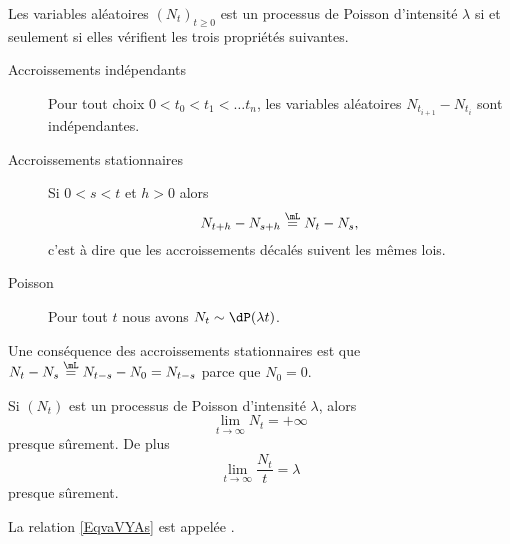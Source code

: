 \begin{theorem}
    Les variables aléatoires \( (N_t)_{t\geq 0}\) est un processus de Poisson d'intensité \( \lambda\) si et seulement si elles vérifient les trois propriétés suivantes.
    \begin{description}
        \item[Accroissements indépendants] Pour tout choix \( 0<t_0<t_1<\ldots t_n\), les variables aléatoires \( N_{t_{i+1}}-N_{t_i}\) sont indépendantes. 
        \item[Accroissements stationnaires] Si \( 0<s<t\) et \( h>0\) alors
            \begin{equation}
                N_{t+h}-N_{s+h}\stackrel{\mL}{=}N_t-N_s,
            \end{equation}
            c'est à dire que les accroissements décalés suivent les mêmes lois.
        \item[Poisson] Pour tout \( t\) nous avons \( N_t\sim\dP(\lambda t)\).
    \end{description}
\end{theorem}
Une conséquence des accroissements stationnaires est que \( N_t-N_s\stackrel{\mL}{=}N_{t-s}-N_0=N_{t-s}\) parce que \( N_0=0\).

\begin{proposition}
    Si \( (N_t)\) est un processus de Poisson d'intensité \( \lambda\), alors 
    \begin{equation}
        \lim_{t\to \infty} N_t=+\infty
    \end{equation}
    presque sûrement. De plus
    \begin{equation}        \label{EqvaVYAs}
        \lim_{t\to \infty} \frac{ N_t }{ t }=\lambda
    \end{equation}
    presque sûrement.
\end{proposition}
La relation \eqref{EqvaVYAs} est appelée .

